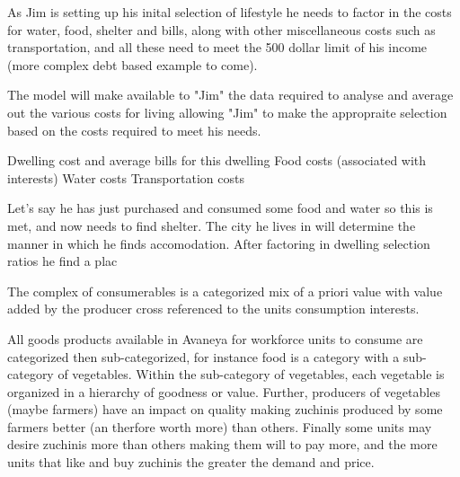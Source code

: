 As Jim is setting up his inital selection of lifestyle he needs to factor in the costs for water, food, shelter and bills, along with other miscellaneous costs such as transportation, and all these need to meet the 500 dollar limit of his income (more complex debt based example to come).

The model will make available to "Jim" the data required to analyse and average out the various costs for living allowing "Jim" to make the appropraite selection based on the costs required to meet his needs.

Dwelling cost and average bills for this dwelling
Food costs (associated with interests)
Water costs
Transportation costs 




Let's say he has just purchased and consumed some food and water so this is met, and now needs to find shelter. The city he lives in will determine the manner in which he finds accomodation. After factoring in dwelling selection ratios he find a plac








The complex of consumerables is a categorized mix of a priori value with value added by the producer cross referenced to the units consumption interests.

All goods products available in Avaneya for workforce units to consume are categorized then sub-categorized, for instance food is a category with a sub-category of vegetables. Within the sub-category of vegetables, each vegetable is organized in a hierarchy of goodness or value. Further, producers of vegetables (maybe farmers) have an impact on quality making zuchinis produced by some farmers better (an therfore worth more) than others. Finally some units may desire zuchinis more than others making them will to pay more, and the more units that like and buy zuchinis the greater the demand and price.

